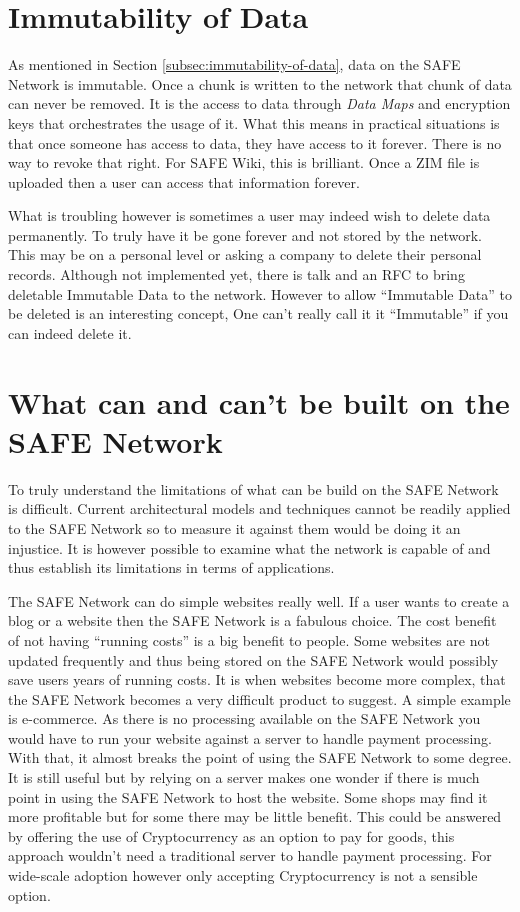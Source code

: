 \section{Immutability of Data}

As mentioned in Section \ref{subsec:immutability-of-data}, data on the SAFE Network is immutable. Once a chunk is written to the network that chunk of data can never be removed. It is the access to data through \textit{Data Maps} and encryption keys that orchestrates the usage of it. What this means in practical situations is that once someone has access to data, they have access to it forever. There is no way to revoke that right. For SAFE Wiki, this is brilliant. Once a ZIM file is uploaded then a user can access that information forever.

What is troubling however is sometimes a user may indeed wish to delete data permanently. To truly have it be gone forever and not stored by the network. This may be on a personal level or asking a company to delete their personal records. Although not implemented yet, there is talk and an RFC\cite{delete-data-rfc} to bring deletable Immutable Data to the network. However to allow ``Immutable Data'' to be deleted is an interesting concept, One can't really call it it ``Immutable'' if you can indeed delete it.

\section{What can and can't be built on the SAFE Network}

To truly understand the limitations of what can be build on the SAFE Network is difficult. Current architectural models and techniques cannot be readily applied to the SAFE Network so to measure it against them would be doing it an injustice. It is however possible to examine what the network is capable of and thus establish its limitations in terms of applications.

The SAFE Network can do simple websites really well. If a user wants to create a blog or a website then the SAFE Network is a fabulous choice. The cost benefit of not having ``running costs'' is a big benefit to people. Some websites are not updated frequently and thus being stored on the SAFE Network would possibly save users years of running costs. It is when websites become more complex, that the SAFE Network becomes a very difficult product to suggest. A simple example is e-commerce. As there is no processing available on the SAFE Network you would have to run your website against a server to handle payment processing. With that, it almost breaks the point of using the SAFE Network to some degree. It is still useful but by relying on a server makes one wonder if there is much point in using the SAFE Network to host the website. Some shops may find it more profitable but for some there may be little benefit. This could be answered by offering the use of Cryptocurrency as an option to pay for goods, this approach wouldn't need a traditional server to handle payment processing. For wide-scale adoption however only accepting Cryptocurrency is not a sensible option.

